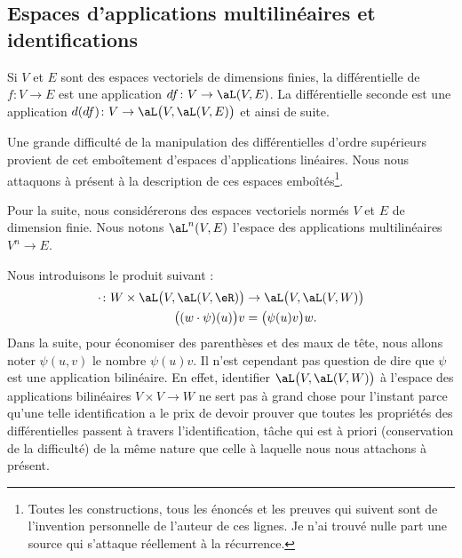 \subsection{Espaces d'applications multilinéaires et identifications}

Si \( V\) et \( E\) sont des espaces vectoriels de dimensions finies, la différentielle de \( f\colon V\to E\) est une application \( df\colon V\to \aL(V,E)\). La différentielle seconde est une application \( d(df)\colon V\to \aL\big( V,\aL(V,E) \big)\) et ainsi de suite.

Une grande difficulté de la manipulation des différentielles d'ordre supérieurs provient de cet emboîtement d'espaces d'applications linéaires. Nous nous attaquons à présent à la description de ces espaces emboîtés\footnote{Toutes les constructions, tous les énoncés et les preuves qui suivent sont de l'invention personnelle de l'auteur de ces lignes. Je n'ai trouvé nulle part une source qui s'attaque réellement à la récurrence.}.

Pour la suite, nous considérerons des espaces vectoriels normés \( V\) et \( E\) de dimension finie. Nous notons \( \aL^n(V,E)\) l'espace des applications multilinéaires \( V^n\to E\).

Nous introduisons le produit suivant\cite{MonCerveau} :
\begin{equation}
	\begin{aligned}
		\cdot\colon W\times \aL\big( V,\aL(V,\eR) \big) & \to \aL\big( V,\aL(V,W) \big) \\
		\big( (w\cdot \psi)(u) \big)v                   & =\big( \psi(u)v \big)w.
	\end{aligned}
\end{equation}
Dans la suite, pour économiser des parenthèses et des maux de tête, nous allons noter \( \psi(u,v)\) le nombre \( \psi(u)v\). Il n'est cependant pas question de dire que \( \psi\) est une application bilinéaire. En effet, identifier \( \aL\big( V,\aL(V,W) \big)\) à l'espace des applications bilinéaires \( V\times V\to W\) ne sert pas à grand chose pour l'instant parce qu'une telle identification a le prix de devoir prouver que toutes les propriétés des différentielles passent à travers l'identification, tâche qui est à priori (conservation de la difficulté) de la même nature que celle à laquelle nous nous attachons à présent.

